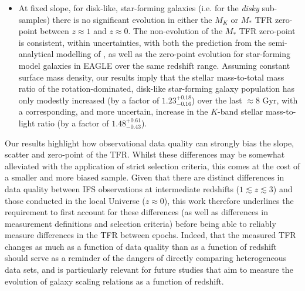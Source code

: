 \documentclass[a4paper,fleqn,usenatbib]{mnras}
\begin{document}
{\begin{itemize}
\newline
\item \noindent At fixed slope, for disk-like, star-forming galaxies (i.e. for the \textit{disky} sub-samples) there is no significant evolution in either the $M_{K}$ or $M_{*}$ TFR zero-point between $z\approx1$ and $z\approx0$. The non-evolution of the $M_{*}$ TFR zero-point is consistent, within uncertainties, with both the prediction from the semi-analytical modelling of \citealt{Dutton:2011}, as well as the zero-point evolution for star-forming model galaxies in EAGLE over the same redshift range. Assuming constant surface mass density, our results imply that the stellar mass-to-total mass ratio of the rotation-dominated, disk-like star-forming galaxy population has only modestly increased (by a factor of $1.23^{+0.18}_{-0.16}$) over the last $\approx8$ Gyr, with a corresponding, and more uncertain, increase in the $K$-band stellar mass-to-light ratio (by a factor of $1.48^{+0.61}_{-0.43}$).
\end{itemize}

Our results highlight how observational data quality can strongly bias the slope, scatter and zero-point of the TFR. Whilst these differences may be somewhat alleviated with the application of strict selection criteria, this comes at the cost of a smaller and more biased sample. Given that there are distinct differences in data quality between IFS observations at intermediate redshifts ($1 \lesssim z \lesssim 3$) and those conducted in the local Universe ($z\approx0$), this work therefore underlines the requirement to first account for these differences (as well as differences in measurement definitions and selection criteria) before being able to reliably measure differences in the TFR between epochs. Indeed, that the measured TFR changes as much as a function of data quality than as a function of redshift should serve as a reminder of the dangers of directly comparing heterogeneous data sets, and is particularly relevant for future studies that aim to measure the evolution of galaxy scaling relations as a function of redshift.

}
\end{document}
